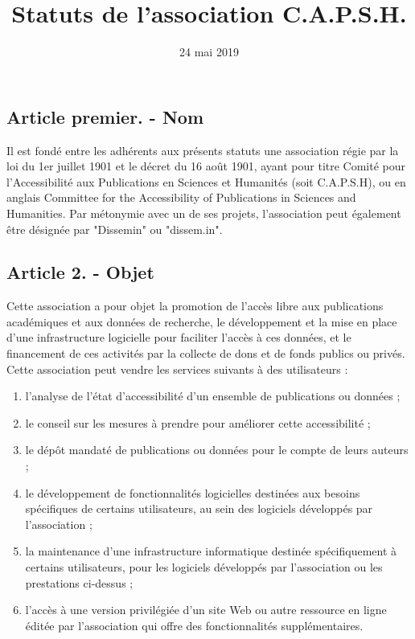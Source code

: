 \documentclass[a4paper]{article}
\title{Statuts de l'association C.A.P.S.H.}
\date{24 mai 2019}
\begin{document}
\maketitle

\subsection*{Article premier. - Nom}

Il est fondé entre les adhérents aux présents statuts une association régie par la loi du 1er juillet 1901 et le décret du 16 août 1901, ayant pour titre Comité pour l'Accessibilité aux Publications en Sciences et Humanités (soit C.A.P.S.H), ou en anglais
Committee for the Accessibility of Publications in Sciences and Humanities.
Par métonymie avec un de ses projets, l'association peut également être désignée par "Dissemin" ou "dissem.in".

\subsection*{Article 2. - Objet}

Cette association a pour objet la promotion de l'accès libre aux publications académiques et
aux données de recherche, le développement et la mise en place d'une infrastructure logicielle pour faciliter l'accès à ces données, et le financement de ces activités par la collecte de dons et de fonds publics ou privés.
Cette association peut vendre les services suivants à des utilisateurs :
\begin{enumerate}
    \item l'analyse de l'état d'accessibilité d'un ensemble de publications ou données ;
    \item le conseil sur les mesures à prendre pour améliorer cette accessibilité ;
    \item le dépôt mandaté de publications ou données pour le compte de leurs auteurs ;
    \item le développement de fonctionnalités logicielles destinées aux besoins spécifiques de certains utilisateurs, au sein des logiciels développés par l'association ;
    \item la maintenance d'une infrastructure informatique destinée spécifiquement à certains utilisateurs, pour les logiciels développés par l'association ou les prestations ci-dessus ;
    \item l'accès à une version privilégiée d'un site Web ou autre ressource en ligne éditée par l'association qui offre des fonctionnalités supplémentaires.
\end{enumerate}
\end{document}
